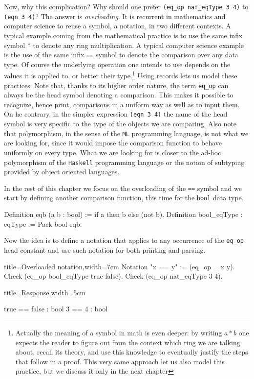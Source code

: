 Now, why this complication?  Why should one prefer
\lstinline/(eq_op nat_eqType 3 4)/ to \lstinline/(eqn 3 4)/?
The answer is \emph{overloading}.
It is recurrent in mathematics and computer science to reuse
a symbol, a notation, in two different contexts.  A typical
example coming from the mathematical practice is to use the same
infix symbol $*$ to denote any ring multiplication.  A typical
computer science example is the use of the same infix
\lstinline/==/ symbol to denote the comparison over any data type.
Of course the underlying operation one intends to use depends on
the values it is applied to, or better their type.\footnote{
Actually the meaning of a symbol in math is even deeper: by writing $a
* b$ one expects the reader to figure out from the context which ring
we are talking about, recall its theory, and use this knowledge to
eventually justify the steps that follow in a proof.  This very
same approach let us also model this practice, but we discuss it only
in the next chapter}
Using records lets us model these practices.
Note that, thanks to its higher order nature, the term \lstinline/eq_op/
can always be the head symbol denoting a comparison.  This makes
it possible to recognize, hence print, comparisons in a uniform way
as well as to input them.  On he contrary, in the simpler expression
\lstinline/(eqn 3 4)/ the name of the head symbol is very specific to
the type of the objects we are comparing.  Also note that
polymorphism, in the sense of the \lstinline/ML/ programming language,
is not what we are looking for, since it would impose the comparison
function to behave uniformly on every type.  What we are looking
for is closer to the ad-hoc polymorphism of the \lstinline/Haskell/
programming language or the notion of subtyping provided by object
oriented languages.

In the rest of this chapter we focus on the overloading of the
\lstinline/==/ symbol and we start by defining another comparison
function, this time for the \lstinline/bool/ data type.

\begin{coq}{}
Definition eqb (a b : bool) := if a then b else (not b).
Definition bool_eqType : eqType := Pack bool eqb.
\end{coq}

Now the idea is to define a notation that applies to any occurrence
of the \lstinline/eq_op/ head constant and use such
notation for both printing and parsing.

\begin{coq}{title=Overloaded notation,width=7cm}
Notation "x == y" := (eq_op _ x y).
Check (eq_op bool_eqType true false).
Check (eq_op nat_eqType 3 4).
\end{coq}
\begin{coqout}{title=Response,width=5cm}

true == false : bool
3 == 4 : bool
\end{coqout}


